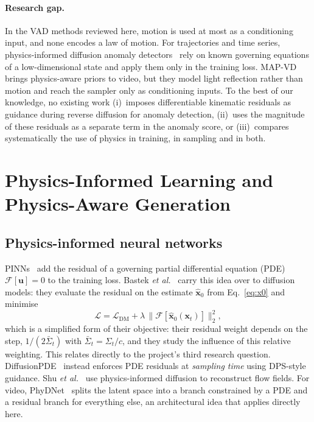 \documentclass[11pt,a4paper]{article}
\begin{document}
\paragraph{Research gap.} In the VAD methods reviewed here, motion is used at most as a conditioning input, and none encodes a law of motion. For trajectories and time series, physics-informed diffusion anomaly detectors~\cite{sharma2025pidpm,soni2025pidm} rely on known governing equations of a low-dimensional state and apply them only in the training loss. MAP-VD~\cite{paul2026mapvd} brings physics-aware priors to video, but they model light reflection rather than motion and reach the sampler only as conditioning inputs. To the best of our knowledge, no existing work (i)~imposes differentiable kinematic residuals as guidance during reverse diffusion for anomaly detection, (ii)~uses the magnitude of these residuals as a separate term in the anomaly score, or (iii)~compares systematically the use of physics in training, in sampling and in both.

\section{Physics-Informed Learning and Physics-Aware Generation}

\subsection{Physics-informed neural networks}
PINNs~\cite{raissi2019pinn} add the residual of a governing partial differential equation (PDE) $\mathcal{F}[\mathbf{u}]=0$ to the training loss. Bastek \emph{et al.}~\cite{bastek2025pidm} carry this idea over to diffusion models: they evaluate the residual on the estimate $\hat{\mathbf{x}}_0$ from Eq.~\eqref{eq:x0} and minimise
\begin{equation}
\mathcal{L}=\mathcal{L}_{\text{DM}}+\lambda\,\big\|\mathcal{F}[\hat{\mathbf{x}}_0(\mathbf{x}_t)]\big\|_2^2 ,
\label{eq:pidm}
\end{equation}
which is a simplified form of their objective: their residual weight depends on the step, $1/(2\bar\Sigma_t)$ with $\bar\Sigma_t=\Sigma_t/c$, and they study the influence of this relative weighting. This relates directly to the project's third research question. DiffusionPDE~\cite{huang2024diffusionpde} instead enforces PDE residuals at \emph{sampling time} using DPS-style guidance. Shu \emph{et al.}~\cite{shu2023physics} use physics-informed diffusion to reconstruct flow fields. For video, PhyDNet~\cite{leguen2020disentangling} splits the latent space into a branch constrained by a PDE and a residual branch for everything else, an architectural idea that applies directly here.
\end{document}
